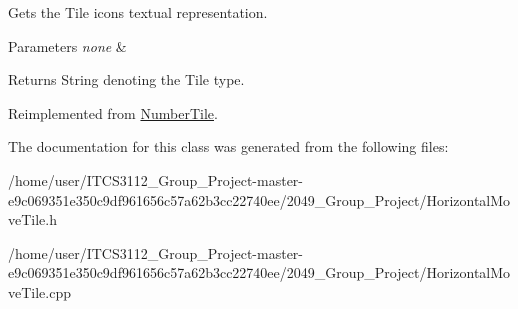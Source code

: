 Gets the Tile icons textual representation.


\begin{DoxyParams}{Parameters}
{\em none} & \\
\hline
\end{DoxyParams}
\begin{DoxyReturn}{Returns}
String denoting the Tile type. 
\end{DoxyReturn}


Reimplemented from \hyperlink{classNumberTile_a33a9dad43334d12c5b3842f1a45b1b66}{Number\+Tile}.



The documentation for this class was generated from the following files\+:\begin{DoxyCompactItemize}
\item 
/home/user/\+I\+T\+C\+S3112\+\_\+\+Group\+\_\+\+Project-\/master-\/e9c069351e350c9df961656c57a62b3cc22740ee/2049\+\_\+\+Group\+\_\+\+Project/Horizontal\+Move\+Tile.\+h\item 
/home/user/\+I\+T\+C\+S3112\+\_\+\+Group\+\_\+\+Project-\/master-\/e9c069351e350c9df961656c57a62b3cc22740ee/2049\+\_\+\+Group\+\_\+\+Project/Horizontal\+Move\+Tile.\+cpp\end{DoxyCompactItemize}

